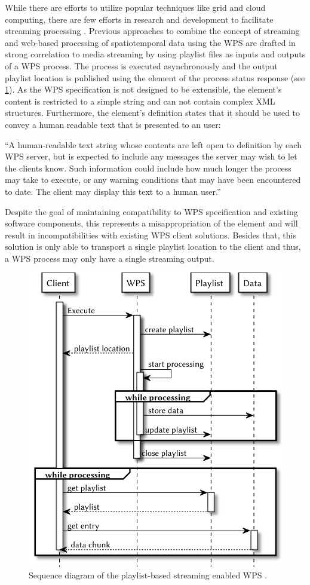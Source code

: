 While there are efforts to utilize popular techniques like grid and cloud computing, there are few efforts in research and development to facilitate streaming processing \citep{foerster2012live}. Previous approaches to combine the concept of streaming and web-based processing of spatiotemporal data using the \ac{WPS} are drafted in strong correlation to media streaming \citep{foerster2012live} by using playlist files \citep{ietf:draft-pantos-http-live-streaming-12} as inputs and outputs of a \ac{WPS} process. The process is executed asynchronously and the output playlist location is published using the  element of the process status response (see \cref{fig:sd:previous}). As the \ac{WPS} specification is not designed to be extensible, the element's content is restricted to a simple string and can not contain complex \ac{XML} structures. Furthermore, the element's definition states that it should be used to convey a human readable text that is presented to an user:
\begin{xquote}
  ``A human-readable text string whose contents are left open to definition by each WPS server, but is expected to include any messages the server may wish to let the clients know. Such information could include how much longer the process may take to execute, or any warning conditions that may have been encountered to date. The client may display this text to a human user.''
\end{xquote}
Despite the goal of maintaining compatibility to \ac{WPS} specification and existing software components, this represents a misappropriation of the element and will result in incompatibilities with existing \ac{WPS} client solutions. Besides that, this solution is only able to transport a single playlist location to the client and thus, a \ac{WPS} process may only have a single streaming output.

\begin{figure}[!htb]
  \centering
  \includegraphics[width = 0.54225352112676062\linewidth]{figures/sequence-diagram-previous.pdf}
  \caption{\label{fig:sd:previous}Sequence diagram of the playlist-based streaming enabled WPS \citep{foerster2012live}.}
\end{figure}

